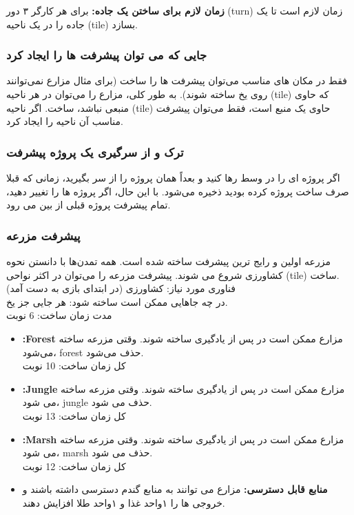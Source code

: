 \documentclass[]{article}
\begin{document}
\noindent \textbf{زمان لازم برای ساختن یک جاده:} 
برای  هر کارگر ۳ دور (turn) زمان لازم است تا یک جاده را در یک ناحیه (tile) بسازد.

\subsubsection*{{\titr جایی که می توان پیشرفت ها را ایجاد کرد}}
فقط در مکان های مناسب می‌توان پیشرفت ها را ساخت (برای مثال مزارع نمی‌توانند روی یخ ساخته شوند).
به طور کلی، مزارع را می‌توان در هر ناحیه (tile) که حاوی منبعی نباشد، ساخت. اگر ناحیه (tile) حاوی یک منبع است، فقط می‌توان پیشرفت مناسب آن ناحیه را ایجاد کرد.

\subsubsection*{{\titr ترک و از سرگیری یک پروژه پیشرفت}}
اگر پروژه ای را در وسط رها کنید و بعداً همان پروژه را از سر بگیرید، زمانی که قبلا صرف ساخت پروژه کرده بودید ذخیره می‌شود. با این حال، اگر پروژه ها را تغییر دهید، تمام پیشرفت پروژه قبلی از بین می رود.

\subsubsection*{{\titr پیشرفت مزرعه}}
مزرعه اولین و رایج ترین پیشرفت ساخته شده است. همه تمدن‌ها با دانستن نحوه کشاورزی شروع می شوند. پیشرفت مزرعه را می‌توان در اکثر نواحی (tile) ساخت.\\
فناوری مورد نیاز: کشاورزی (در ابتدای بازی به دست آمد)\\
در چه جاهایی ممکن است ساخته شود: هر جایی جز یخ.\\
مدت زمان ساخت: 6 نوبت
\begin{itemize}
	\item \textbf{:Forest}    مزارع ممکن است در  پس از یادگیری  ساخته شوند. وقتی مزرعه ساخته می‌شود، forest حذف می‌شود.\\
کل زمان ساخت: 10 نوبت

	\item \textbf{:Jungle} مزارع ممکن است در  پس از یادگیری  ساخته شوند. وقتی مزرعه ساخته می شود، jungle حذف می شود.\\
کل زمان ساخت: 13 نوبت

	\item \textbf{:Marsh} مزارع ممکن است در  پس از یادگیری  ساخته شوند. وقتی مزرعه ساخته می شود، marsh حذف می شود.\\
کل زمان ساخت: 12 نوبت

	\item \textbf{منابع قابل دسترسی:} مزارع می توانند به منابع گندم دسترسی داشته باشند و  خروجی ها را ۱واحد غذا و ۱واحد طلا افزایش دهند.

\end{itemize}
\end{document}
